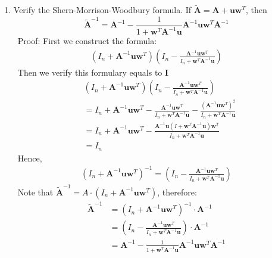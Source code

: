 \documentclass[12pt]{amsart}
\numberwithin{equation}{section}
\numberwithin{table}{section}
\numberwithin{figure}{section}
\numberwithin{algorithm}{section}
\begin{document}
\begin{enumerate}
\item Verify the Shern-Morrison-Woodbury formula. If $\widetilde{\mathbf{A}} = \mathbf{A} + \mathbf{uw}^{T}$, then
$$
\widetilde{\mathbf{A}}^{-1} = \mathbf{A}^{-1} - \frac{1}{1+\mathbf{w}^{T} \mathbf{A}^{-1} \mathbf{u}} \mathbf{A}^{-1} \mathbf{u w}^{T} \mathbf{A}^{-1}
$$\
Proof:
First we construct the formula:\
\begin{align*}
(I_n+\mathbf{A}^{-1}\mathbf{u}\mathbf{w}^{T})(I_n-\frac{\mathbf{A}^{-1}\mathbf{u}\mathbf{w}^{T}}{I_n+\mathbf{w}^{T}\mathbf{A}^{-1}\mathbf{u}})
\end{align*}\
Then we verify this formulary equals to $\mathbf{I}$
\begin{align*}
&(I_n+\mathbf{A}^{-1}\mathbf{u}\mathbf{w}^{T})(I_n-\frac{\mathbf{A}^{-1}\mathbf{u}\mathbf{w}^{T}}{I_n+\mathbf{w}^{T}\mathbf{A}^{-1}\mathbf{u}})\\
&=I_n + \mathbf{A}^{-1}\mathbf{u}\mathbf{w}^{T}- \frac{\mathbf{A}^{-1}\mathbf{u}\mathbf{w}^{T}}{I_n+\mathbf{w}^{T}\mathbf{A}^{-1}\mathbf{u}}-
\frac{(\mathbf{A}^{-1}\mathbf{u}\mathbf{w}^{T})^2}{I_n+\mathbf{w}^{T}\mathbf{A}^{-1}\mathbf{u}}\\
&=I_n + \mathbf{A}^{-1}\mathbf{u}\mathbf{w}^{T}- \frac{\mathbf{A}^{-1}\mathbf{u}(I + \mathbf{w}^{T}\mathbf{A}^{-1}\mathbf{u} )\mathbf{w}^{T}}{I_n+\mathbf{w}^{T}\mathbf{A}^{-1}\mathbf{u}}\\
&=I_n
\end{align*}\
Hence,
\begin{align*}
(I_n+\mathbf{A}^{-1}\mathbf{u}\mathbf{w}^{T})^{-1}=(I_n-\frac{\mathbf{A}^{-1}\mathbf{u}\mathbf{w}^{T}}{I_n+\mathbf{w}^{T}\mathbf{A}^{-1}\mathbf{u}})
\end{align*}\
Note that $\widetilde{\mathbf{A}}^{-1}=A\cdot (I_n+\mathbf{A}^{-1}\mathbf{u}\mathbf{w}^{T})$, therefore:\
\begin{align*}
\widetilde{\mathbf{A}}^{-1}&=(I_n+\mathbf{A}^{-1}\mathbf{u}\mathbf{w}^{T})^{-1}\cdot \mathbf{A}^{-1}\\
&=(I_n-\frac{\mathbf{A}^{-1}\mathbf{u}\mathbf{w}^{T}}{I_n+\mathbf{w}^{T}\mathbf{A}^{-1}\mathbf{u}})\cdot \mathbf{A}^{-1}\\
&=\mathbf{A}^{-1} - \frac{1}{1+\mathbf{w}^{T} \mathbf{A}^{-1} \mathbf{u}} \mathbf{A}^{-1} \mathbf{u w}^{T} \mathbf{A}^{-1}\\
\end{align*}\
\


\end{enumerate}
\end{document}
